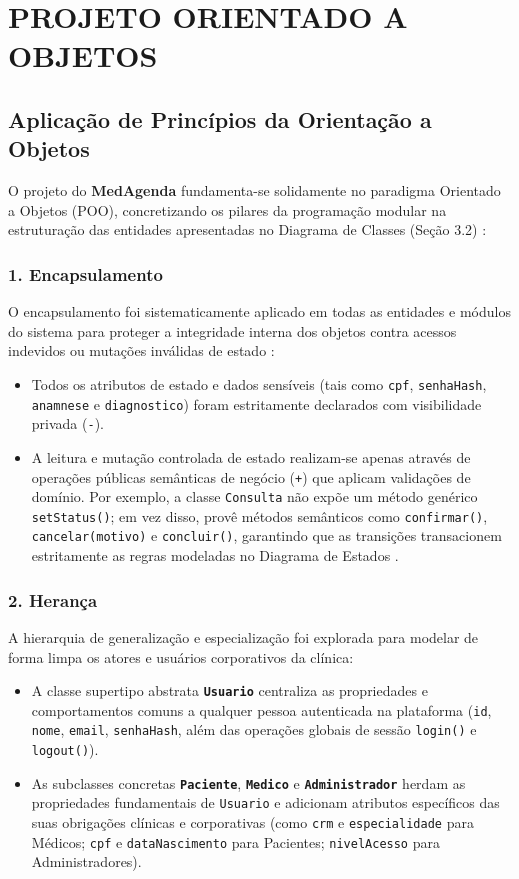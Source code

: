 \section{PROJETO ORIENTADO A OBJETOS}

\subsection{Aplicação de Princípios da Orientação a Objetos}

O projeto do \textbf{MedAgenda} fundamenta-se solidamente no paradigma Orientado a Objetos (POO), concretizando os pilares da programação modular na estruturação das entidades apresentadas no Diagrama de Classes (Seção 3.2) \cite{meyer1997}:

\subsubsection{1. Encapsulamento}
O encapsulamento foi sistematicamente aplicado em todas as entidades e módulos do sistema para proteger a integridade interna dos objetos contra acessos indevidos ou mutações inválidas de estado \cite{larman2004}:
\begin{itemize}
    \item Todos os atributos de estado e dados sensíveis (tais como \texttt{cpf}, \texttt{senhaHash}, \texttt{anamnese} e \texttt{diagnostico}) foram estritamente declarados com visibilidade privada (\texttt{-}).
    \item A leitura e mutação controlada de estado realizam-se apenas através de operações públicas semânticas de negócio (\texttt{+}) que aplicam validações de domínio. Por exemplo, a classe \texttt{Consulta} não expõe um método genérico \texttt{setStatus()}; em vez disso, provê métodos semânticos como \texttt{confirmar()}, \texttt{cancelar(motivo)} e \texttt{concluir()}, garantindo que as transições transacionem estritamente as regras modeladas no Diagrama de Estados \cite{meyer1997}.
\end{itemize}

\subsubsection{2. Herança}
A hierarquia de generalização e especialização foi explorada para modelar de forma limpa os atores e usuários corporativos da clínica:
\begin{itemize}
    \item A classe supertipo abstrata \textbf{\texttt{Usuario}} centraliza as propriedades e comportamentos comuns a qualquer pessoa autenticada na plataforma (\texttt{id}, \texttt{nome}, \texttt{email}, \texttt{senhaHash}, além das operações globais de sessão \texttt{login()} e \texttt{logout()}).
    \item As subclasses concretas \textbf{\texttt{Paciente}}, \textbf{\texttt{Medico}} e \textbf{\texttt{Administrador}} herdam as propriedades fundamentais de \texttt{Usuario} e adicionam atributos específicos das suas obrigações clínicas e corporativas (como \texttt{crm} e \texttt{especialidade} para Médicos; \texttt{cpf} e \texttt{dataNascimento} para Pacientes; \texttt{nivelAcesso} para Administradores).
\end{itemize}

